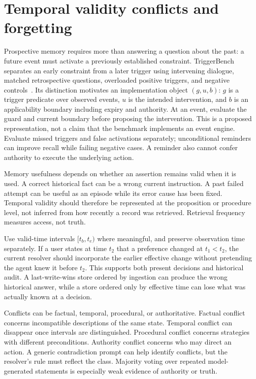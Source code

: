 \section{Temporal validity conflicts and forgetting}\label{sec:C14:validity}
Prospective memory requires more than answering a question about the past: a future event must activate a previously established constraint. TriggerBench separates an early constraint from a later trigger using intervening dialogue, matched retrospective questions, overloaded positive triggers, and negative controls~\cite{zhang2026triggerbench}. Its distinction motivates an implementation object $(g,u,b)$: $g$ is a trigger predicate over observed events, $u$ is the intended intervention, and $b$ is an applicability boundary including expiry and authority. At an event, evaluate the guard and current boundary before proposing the intervention. This is a proposed representation, not a claim that the benchmark implements an event engine. Evaluate missed triggers and false activations separately; unconditional reminders can improve recall while failing negative cases. A reminder also cannot confer authority to execute the underlying action.

Memory usefulness depends on whether an assertion remains valid when it is used. A correct historical fact can be a wrong current instruction. A past failed attempt can be useful as an episode while its error cause has been fixed. Temporal validity should therefore be represented at the proposition or procedure level, not inferred from how recently a record was retrieved. Retrieval frequency measures access, not truth.

Use valid-time intervals $[t_b,t_e)$ where meaningful, and preserve observation time separately. If a user states at time $t_2$ that a preference changed at $t_1<t_2$, the current resolver should incorporate the earlier effective change without pretending the agent knew it before $t_2$. This supports both present decisions and historical audit. A last-write-wins store ordered by ingestion can produce the wrong historical answer, while a store ordered only by effective time can lose what was actually known at a decision.

Conflicts can be factual, temporal, procedural, or authoritative. Factual conflict concerns incompatible descriptions of the same state. Temporal conflict can disappear once intervals are distinguished. Procedural conflict concerns strategies with different preconditions. Authority conflict concerns who may direct an action. A generic contradiction prompt can help identify conflicts, but the resolver's rule must reflect the class. Majority voting over repeated model-generated statements is especially weak evidence of authority or truth.

